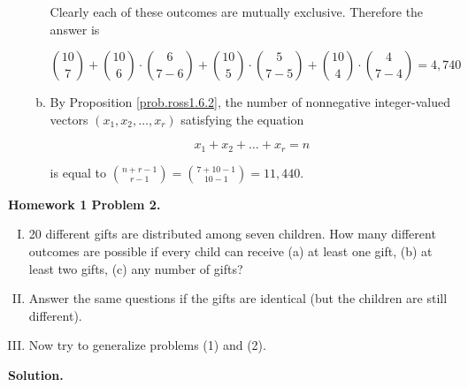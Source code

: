 \begin{enumerate}[(I)]
\begin{enumerate}[(a)]
\begin{enumerate}[(i)]
\end{enumerate}

Clearly each of these outcomes are mutually exclusive. Therefore the answer is

\[
\binom{10}{7} + \binom{10}{6}\cdot \binom{6}{7 - 6} +  \binom{10}{5}\cdot \binom{5}{7 - 5} + \binom{10}{4}\cdot \binom{4}{7 - 4} = \boxed{4,740}
\]

\item By Proposition \ref{prob.ross1.6.2}, the number of nonnegative integer-valued vectors \((x_1, x_2, \ldots, x_r)\) satisfying the equation

\[
x_1 + x_2 + \ldots + x_r = n
\]

is equal to \(\binom{n + r - 1}{r - 1} = \binom{7 + 10 - 1}{10 - 1} = \boxed{11,440}\).

\end{enumerate}

\end{enumerate}


\textbf{Homework 1 Problem 2.} 

\begin{enumerate}[(I)]

\item 20 different gifts are distributed among seven children. How many different outcomes are possible if every child can receive (a) at least one gift, (b) at least two gifts, (c) any number of gifts?

\item Answer the same questions if the gifts are identical (but the children are still different).

\item Now try to generalize problems (1) and (2).

\end{enumerate}

\textbf{Solution.} 

